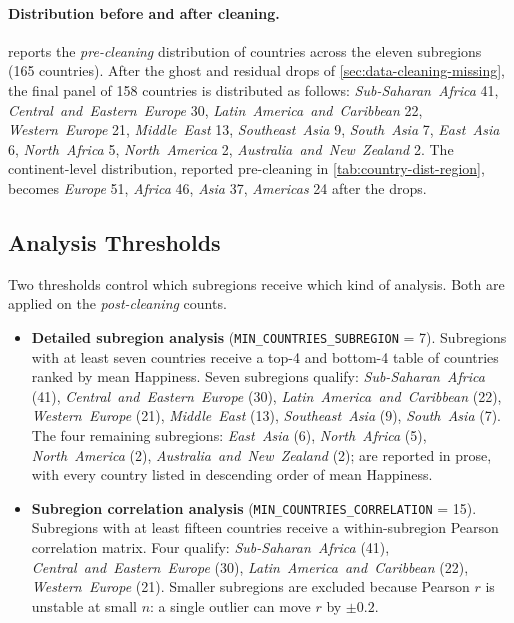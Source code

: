 \paragraph{Distribution before and after cleaning.}  reports the \emph{pre-cleaning} distribution of countries across the eleven subregions (165 countries). After the ghost and residual drops of \cref{sec:data-cleaning-missing}, the final panel of 158 countries is distributed as follows: \emph{Sub-Saharan\ Africa} 41, \emph{Central\ and\ Eastern\ Europe} 30, \emph{Latin\ America\ and\ Caribbean} 22, \emph{Western\ Europe} 21, \emph{Middle\ East} 13, \emph{Southeast\ Asia} 9, \emph{South\ Asia} 7, \emph{East\ Asia} 6, \emph{North\ Africa} 5, \emph{North\ America} 2, \emph{Australia\ and\ New\ Zealand} 2. The continent-level distribution, reported pre-cleaning in \cref{tab:country-dist-region}, becomes \emph{Europe} 51, \emph{Africa} 46, \emph{Asia} 37, \emph{Americas} 24 after the drops.



\subsection{Analysis Thresholds}
\label{sec:methodology-thresholds}

Two thresholds control which subregions receive which kind of analysis. Both are applied on the \emph{post-cleaning} counts.

\begin{itemize}
	\item \textbf{Detailed subregion analysis} (\texttt{MIN\_COUNTRIES\_SUBREGION} = 7). Subregions with at least seven countries receive a top-4 and bottom-4 table of countries ranked by mean Happiness. Seven subregions qualify: \emph{Sub-Saharan\ Africa} (41), \emph{Central\ and\ Eastern\ Europe} (30), \emph{Latin\ America\ and\ Caribbean} (22), \emph{Western\ Europe} (21), \emph{Middle\ East} (13), \emph{Southeast\ Asia} (9), \emph{South\ Asia} (7). The four remaining subregions: \emph{East\ Asia} (6), \emph{North\ Africa} (5), \emph{North\ America} (2), \emph{Australia\ and\ New\ Zealand} (2); are reported in prose, with every country listed in descending order of mean Happiness.
	\item \textbf{Subregion correlation analysis} (\texttt{MIN\_COUNTRIES\_CORRELATION} = 15). Subregions with at least fifteen countries receive a within-subregion Pearson correlation matrix. Four qualify: \emph{Sub-Saharan\ Africa} (41), \emph{Central\ and\ Eastern\ Europe} (30), \emph{Latin\ America\ and\ Caribbean} (22), \emph{Western\ Europe} (21). Smaller subregions are excluded because Pearson \(r\) is unstable at small \(n\): a single outlier can move \(r\) by $\pm 0.2$.
\end{itemize}


